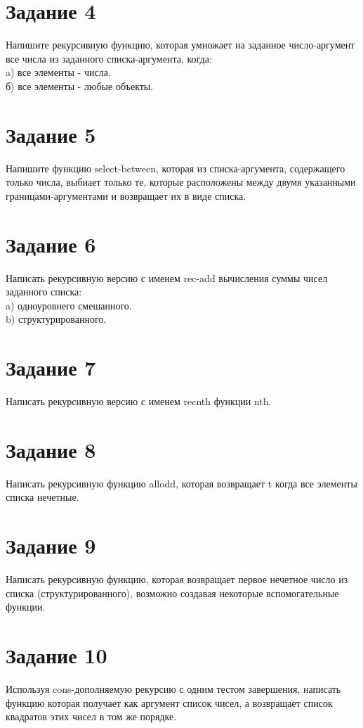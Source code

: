 \section{Задание 4}
Напишите рекурсивную функцию, которая умножает на заданное число-аргумент все числа из заданного списка-аргумента, когда:\\
a) все элементы - числа.\\
б) все элементы - любые объекты.

\section{Задание 5}
Напишите функцию select-between, которая из списка-аргумента, содержащего только числа, выбиает только те, которые расположены между двумя указанными границами-аргументами и возвращает их в виде списка.

\section{Задание 6}
Написать рекурсивную версию с именем rec-add вычисления суммы чисел заданного списка:\\
a) одноуровнего смешанного.\\
b) структурированного.

\section{Задание 7}
Написать рекурсивную версию с именем recnth функции nth.

\section{Задание 8}
Написать рекурсивную функцию allodd, которая возвращает t когда все элементы списка нечетные.

\section{Задание 9}
Написать рекурсивную функцию, которая возвращает первое нечетное число из списка (структурированного), возможно создавая некоторые вспомогательные функции.

\section{Задание 10}
Используя cons-дополняемую рекурсию с одним тестом завершения, написать функцию которая получает как аргумент список чисел, а возвращает список квадратов этих чисел в том же порядке.